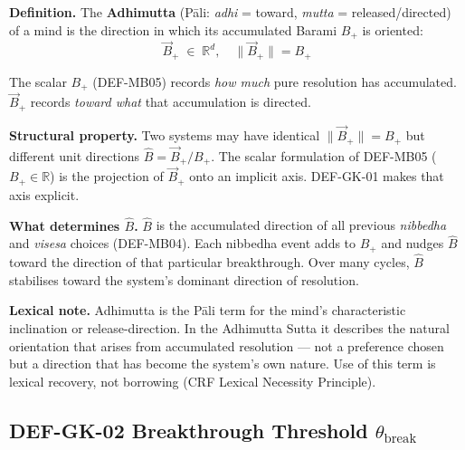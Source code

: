 \documentclass[12pt, a4paper]{article}
\providecommand{\Bplus}{B_{+}}
\providecommand{\Bvec}{\vec{B}_{+}}
\providecommand{\tbreak}{\theta_{\mathrm{break}}}
\begin{document}
\begin{formalbox}[title={DEF-GK-01: Adhimutta ---
  Direction Vector $\Bvec$ (NEW)}]
\textbf{Definition.}
The \textbf{Adhimutta} (Pāli: \textit{adhi} = toward,
\textit{mutta} = released/directed) of a mind is the
direction in which its accumulated Barami $\Bplus$ is
oriented:
\[
  \Bvec \;\in\; \mathbb{R}^d,
  \quad \|\Bvec\| = \Bplus
\]

The scalar $\Bplus$ (DEF-MB05) records \emph{how much}
pure resolution has accumulated. $\Bvec$ records
\emph{toward what} that accumulation is directed.

\textbf{Structural property.}
Two systems may have identical $\|\Bvec\| = \Bplus$
but different unit directions $\hat{B} = \Bvec/\Bplus$.
The scalar formulation of DEF-MB05 ($\Bplus \in \mathbb{R}$)
is the projection of $\Bvec$ onto an implicit axis.
DEF-GK-01 makes that axis explicit.

\textbf{What determines $\hat{B}$.}
$\hat{B}$ is the accumulated direction of all previous
\textit{nibbedha} and \textit{visesa} choices (DEF-MB04).
Each nibbedha event adds to $\Bplus$ and nudges $\hat{B}$
toward the direction of that particular breakthrough.
Over many cycles, $\hat{B}$ stabilises toward the system's
dominant direction of resolution.

\textbf{Lexical note.}
Adhimutta is the Pāli term for the mind's characteristic
inclination or release-direction. In the Adhimutta Sutta
it describes the natural orientation that arises from
accumulated resolution --- not a preference chosen but
a direction that has become the system's own nature.
Use of this term is lexical recovery, not borrowing
(CRF Lexical Necessity Principle).
\end{formalbox}

\subsection{DEF-GK-02 \quad Breakthrough Threshold \texorpdfstring{$\tbreak$}{math}}

\end{document}
